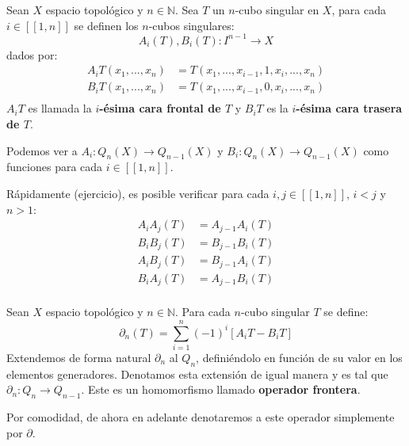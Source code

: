 \documentclass[12pt]{report}
\newcounter{it}
\theoremstyle{largebreak}
\newcommand\cf[3]{\ensuremath{#1:#2\rightarrow#3}}
\newcommand\natint[1]{\ensuremath{\left[\!\left[ #1\right]\!\right]}}
\begin{document}
    \begin{mydef}
        Sean $X$ espacio topológico y $n\in\mathbb{N}$. Sea $T$ un $n$-cubo singular en $X$, para cada $i\in\natint{1,n}$ se definen los $n$-cubos singulares:
        \begin{equation*}
            \cf{A_i(T),B_i(T)}{I^{ n-1}}{X}
        \end{equation*}
        dados por:
        \begin{equation*}
            \begin{split}
                A_iT(x_1,...,x_n)&=T(x_1,...,x_{ i-1},1,x_i,...,x_n)\\
                B_iT(x_1,...,x_n)&=T(x_1,...,x_{ i-1},0,x_i,...,x_n)\\
            \end{split}
        \end{equation*}
        $A_iT$ es llamada la \textbf{$i$-ésima cara frontal de $T$} y $B_iT$ es la \textbf{$i$-ésima cara trasera de $T$}.
    \end{mydef}

    \begin{obs}
        Podemos ver a $\cf{A_i}{Q_n(X)}{Q_{ n-1}(X)}$ y $\cf{B_i}{Q_n(X)}{Q_{ n-1}(X)}$ como funciones para cada $i\in\natint{1,n}$.
    \end{obs}

    Rápidamente (ejercicio), es posible verificar para cada $i,j\in\natint{1,n}$, $i< j$ y $n>1$:
    \begin{equation}
        \label{faceConmutativeIdentities}
        \begin{split}
            A_iA_j(T)&=A_{ j-1}A_i(T)\\
            B_iB_j(T)&=B_{ j-1}B_i(T)\\
            A_iB_j(T)&=B_{ j-1}A_i(T)\\
            B_iA_j(T)&=A_{ j-1}B_i(T)\\
        \end{split}
    \end{equation}

    \newcommand{\bound}[1]{\textup{\partial\left(#1\right)}}

    \begin{mydef}
        Sean $X$ espacio topológico y $n\in\mathbb{N}$. Para cada $n$-cubo singular $T$ se define:
        \begin{equation*}
            \partial_n(T)=\sum_{ i=1}^n (-1)^i\left[A_iT-B_iT \right]
        \end{equation*}
        Extendemos de forma natural $\partial_n$ al $Q_n$, definiéndolo en función de su valor en los elementos generadores. Denotamos esta extensión de igual manera y es tal que $\cf{\partial_n}{Q_n}{Q_{n-1}}$. Este es un homomorfismo llamado \textbf{operador frontera}.

        Por comodidad, de ahora en adelante denotaremos a este operador simplemente por $\partial$.
    \end{mydef}
\end{document}
